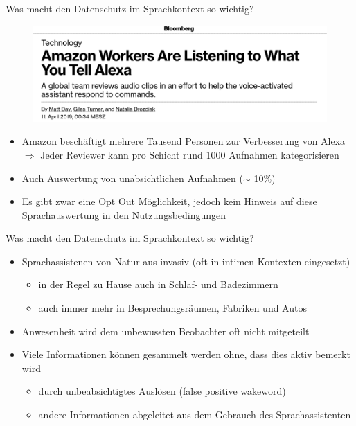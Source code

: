 \documentclass[aspectratio=169]{beamer}
\begin{document}
\begin{frame}{Was macht den Datenschutz im Sprachkontext so wichtig?}
	\begin{figure}
		\includegraphics[scale=0.3]{images/alexa-audio-reviews}
	\end{figure}
	\begin{itemize} 
		\item Amazon beschäftigt mehrere Tausend Personen zur Verbesserung von Alexa $\Rightarrow$ Jeder Reviewer kann pro Schicht rund 1000 Aufnahmen kategorisieren
		\item Auch Auswertung von unabsichtlichen Aufnahmen ($\sim$ 10\%)
		\item Es gibt zwar eine Opt Out Möglichkeit, jedoch kein Hinweis auf diese Sprachauswertung in den Nutzungsbedingungen
	\end{itemize}
\end{frame}

\begin{frame}{Was macht den Datenschutz im Sprachkontext so wichtig?}
	\begin{itemize} 
		\item Sprachassistenen von Natur aus invasiv (oft in intimen Kontexten eingesetzt)
		\begin{itemize} 
			\item in der Regel zu Hause auch in Schlaf- und Badezimmern
			\item auch immer mehr in Besprechungsräumen, Fabriken und Autos
		\end{itemize}
	    \item Anwesenheit wird dem unbewussten Beobachter oft nicht mitgeteilt
	    \item Viele Informationen können gesammelt werden ohne, dass dies aktiv bemerkt wird
	    \begin{itemize} 
	    	\item durch unbeabsichtigtes Auslösen (false positive wakeword)
	    	\item andere Informationen abgeleitet aus dem Gebrauch des Sprachassistenten
	    \end{itemize}
	\end{itemize}
\end{frame}
\end{document}
